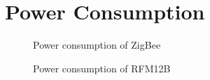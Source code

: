 
\section{Power Consumption}

\begin{figure}
\begin{centering}
\protect\caption{Power consumption of ZigBee}

\par\end{centering}

\end{figure}
\begin{figure}

\begin{centering}
\protect\caption{Power consumption of RFM12B}

\par\end{centering}

\end{figure}

